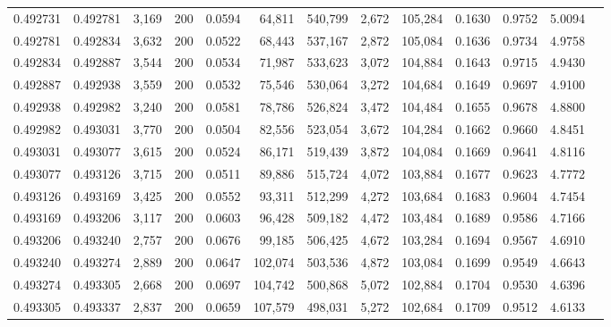 \begin{tabular}{rrrrrrrrrrrrr}
0.492731 & 0.492781 & 3,169 & 200 &                                     0.0594 &  64,811 & 540,799 &   2,672 & 105,284 & 0.1630 & 0.9752 & 5.0094 \\
0.492781 & 0.492834 & 3,632 & 200 &                                     0.0522 &  68,443 & 537,167 &   2,872 & 105,084 & 0.1636 & 0.9734 & 4.9758 \\
0.492834 & 0.492887 & 3,544 & 200 &                                     0.0534 &  71,987 & 533,623 &   3,072 & 104,884 & 0.1643 & 0.9715 & 4.9430 \\
0.492887 & 0.492938 & 3,559 & 200 &                                     0.0532 &  75,546 & 530,064 &   3,272 & 104,684 & 0.1649 & 0.9697 & 4.9100 \\
0.492938 & 0.492982 & 3,240 & 200 &                                     0.0581 &  78,786 & 526,824 &   3,472 & 104,484 & 0.1655 & 0.9678 & 4.8800 \\
0.492982 & 0.493031 & 3,770 & 200 &                                     0.0504 &  82,556 & 523,054 &   3,672 & 104,284 & 0.1662 & 0.9660 & 4.8451 \\
0.493031 & 0.493077 & 3,615 & 200 &                                     0.0524 &  86,171 & 519,439 &   3,872 & 104,084 & 0.1669 & 0.9641 & 4.8116 \\
0.493077 & 0.493126 & 3,715 & 200 &                                     0.0511 &  89,886 & 515,724 &   4,072 & 103,884 & 0.1677 & 0.9623 & 4.7772 \\
0.493126 & 0.493169 & 3,425 & 200 &                                     0.0552 &  93,311 & 512,299 &   4,272 & 103,684 & 0.1683 & 0.9604 & 4.7454 \\
0.493169 & 0.493206 & 3,117 & 200 &                                     0.0603 &  96,428 & 509,182 &   4,472 & 103,484 & 0.1689 & 0.9586 & 4.7166 \\
0.493206 & 0.493240 & 2,757 & 200 &                                     0.0676 &  99,185 & 506,425 &   4,672 & 103,284 & 0.1694 & 0.9567 & 4.6910 \\
0.493240 & 0.493274 & 2,889 & 200 &                                     0.0647 & 102,074 & 503,536 &   4,872 & 103,084 & 0.1699 & 0.9549 & 4.6643 \\
0.493274 & 0.493305 & 2,668 & 200 &                                     0.0697 & 104,742 & 500,868 &   5,072 & 102,884 & 0.1704 & 0.9530 & 4.6396 \\
0.493305 & 0.493337 & 2,837 & 200 &                                     0.0659 & 107,579 & 498,031 &   5,272 & 102,684 & 0.1709 & 0.9512 & 4.6133 \\

\end{tabular}
